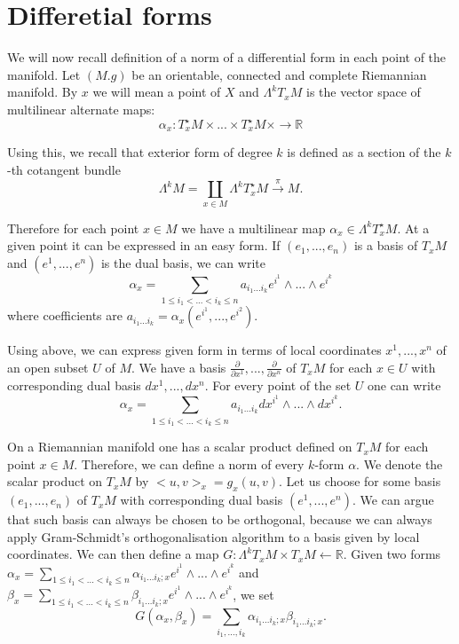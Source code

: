 \documentclass[licencjacka]{pracamgr}
\theoremstyle{definition}
\theoremstyle{definition}
\theoremstyle{plain}
\theoremstyle{plain}
\begin{document}
\section{Differetial forms}

We will now recall definition of a norm of a differential form in each point of
the manifold. Let $(M. g)$ be an orientable, connected and complete Riemannian 
manifold. By $x$ we will mean a point of $X$ and $\Lambda^k T_x M$ is the vector
space of multilinear alternate maps:
\[
    \alpha_x:T_x^\star M \times ... \times T_x^\star M \times \rightarrow \mathbb{R}
\]

Using this, we recall that exterior form of degree $k$ is defined as a section of 
the $k$-th cotangent bundle
\[
    \Lambda^k M = \coprod_{x \in M} 
    \Lambda^k T_x^\star M \xrightarrow{\pi} M.
\]

Therefore for each point $x \in M$ we have a multilinear map $\alpha_x \in
\Lambda^k T_x^\star M$. At a given point it can be expressed in an easy form.
If $(e_1, ..., e_n)$ is a basis of $T_x M$ and $(e^1, ..., e^n)$ is the dual basis,
we can write
\[
    \alpha_x = \sum_{1 \leq i_1 < ... < i_k \leq n} a_{i_1 ... i_k} e^{i^1} \wedge ...
    \wedge e^{i^k}
\] 
where coefficients are $a_{i_1 ... i_k} = \alpha_x(e^{i^1}, ..., e^{i^2})$.

Using above, we can express given form in terms of local coordinates $x^1, ...,
x^n$ of an open subset $U$ of $M$. We have a basis $\frac{\partial}{\partial
x^1}, ..., \frac{\partial}{\partial x^n}$ of $T_x M$ for each $x \in U$ with
corresponding dual basis $dx^1, ..., dx^n$. For every point of the set $U$ one
can write
\[
    \alpha_x = \sum_{1 \leq i_1 < ... < i_k \leq n} a_{i_1 ... i_k}
       dx^{i^1} \wedge ...  \wedge dx^{i^k}.
\] 

On a Riemannian manifold one has a scalar product defined on $T_x M$ for each
point $x \in M$. Therefore, we can define a norm of every $k$-form $\alpha$.
We denote the scalar product on $T_x M$ by $<u, v>_x = g_x(u, v)$. Let us choose for
some basis $(e_1, ..., e_n)$ of $T_x M$ with corresponding dual basis $(e^1, ..., e^n)$.
We can argue that such basis can always be chosen to be orthogonal, because we can
always apply Gram-Schmidt's orthogonalisation algorithm to a basis given by local
coordinates. We can then define a map $G: \Lambda^k T_x M \times T_x M
\leftarrow \mathbb{R}$. Given two forms 
$ \alpha_x = \sum_{1 \leq i_1 < ... < i_k \leq n} \alpha_{i_1 ... i_k; x} e^{i^1}
\wedge ...  \wedge e^{i^k}$ and
$ \beta_x = \sum_{1 \leq i_1 < ... < i_k \leq n} \beta_{i_1 ... i_k; x} e^{i^1}
\wedge ...  \wedge e^{i^k}$, we set
\[
    G(\alpha_x, \beta_x) = \sum_{i_1, ..., i_k} \alpha_{i_1 ... i_k; x}
                                                    \beta_{i_1 ... i_k; x}.
\]
\end{document}
